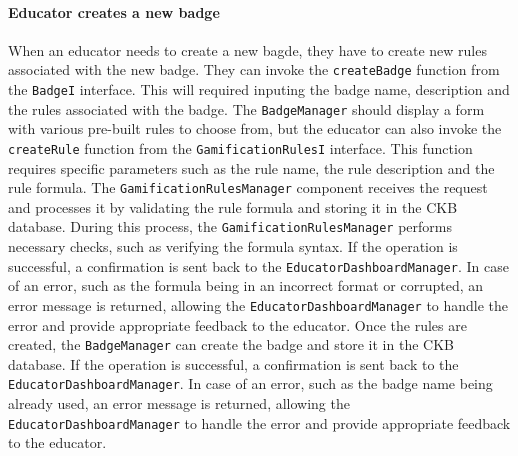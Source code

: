 \paragraph{Educator creates a new badge}
When an educator needs to create a new bagde, they have to create new rules associated with the new badge. They can invoke the \verb|createBadge| function from the \verb|BadgeI| interface. This will required inputing the badge name, description and the rules associated with the badge.
The \verb|BadgeManager| should display a form with various pre-built rules to choose from, but the educator can also invoke the \verb|createRule| function from the \verb|GamificationRulesI| interface.
This function requires specific parameters such as the rule name, the rule description and the rule formula. The \verb|GamificationRulesManager| component receives the request and processes it by validating the rule formula and storing it in the CKB database.
During this process, the \verb|GamificationRulesManager| performs necessary checks, such as verifying the formula syntax. If the operation is successful, a confirmation is sent back to the \verb|EducatorDashboardManager|.
In case of an error, such as the formula being in an incorrect format or corrupted, an error message is returned, allowing the \verb|EducatorDashboardManager| to handle the error and provide appropriate feedback to the educator.
Once the rules are created, the \verb|BadgeManager| can create the badge and store it in the CKB database. If the operation is successful, a confirmation is sent back to the \verb|EducatorDashboardManager|.
In case of an error, such as the badge name being already used, an error message is returned, allowing the \verb|EducatorDashboardManager| to handle the error and provide appropriate feedback to the educator.

